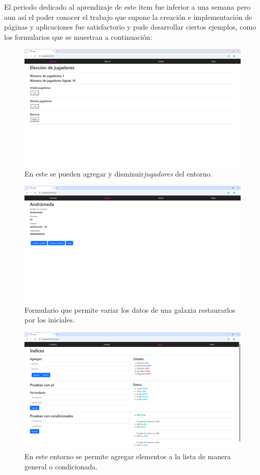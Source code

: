 El periodo dedicado al aprendizaje de este ítem fue inferior a una semana pero aun así el poder conocer el trabajo que supone la creación e implementación de páginas y aplicaciones fue satisfactorio y pude desarrollar ciertos ejemplos, como los formularios que se muestran a continuación:

\begin{figure}[H]
    \centering
    \includegraphics[width=0.8\linewidth]{figuras/pag1.png}
    \caption[Formulario web: Página 1]{En este se pueden agregar y disminuir\textit{jugadores} del entorno.}
    \label{pag1}
\end{figure}
\begin{figure}[H]
     \centering
    \includegraphics[width=0.8\linewidth]{figuras/pag2.png}
    \caption[Formulario web: Página 2]{Formulario que permite variar los datos de una galaxia restaurarlos por los iniciales.}
    \label{pag2}
\end{figure}
\begin{figure}[H]
\centering
    \includegraphics[width=0.8\linewidth]{figuras/pag3.png}
    \caption[Formulario web: Página 3]{En este entorno se permite agregar elementos a la lista de manera general o condicionada.}
    \label{pag3}
\end{figure}
